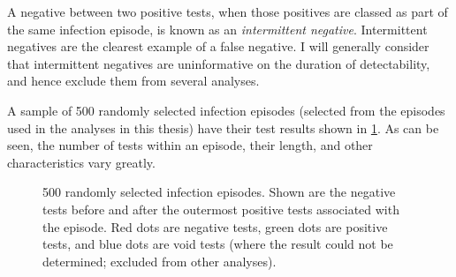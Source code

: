 \documentclass[12pt, letterpaper]{article} %
\begin{document}
A negative between two positive tests, when those positives are classed as part of the same infection episode, is known as an \emph{intermittent negative}.
Intermittent negatives are the clearest example of a false negative.
I will generally consider that intermittent negatives are uninformative on the duration of detectability, and hence exclude them from several analyses.

A sample of 500 randomly selected infection episodes (selected from the episodes used in the analyses in this thesis) have their test results shown in \cref{biology-data:fig:episodes}.
As can be seen, the number of tests within an episode, their length, and other characteristics vary greatly.
\begin{figure}
  \vspace{-5cm}
  \caption[CIS infection episodes]{%
    500 randomly selected infection episodes.
    Shown are the negative tests before and after the outermost positive tests associated with the episode.
    Red dots are negative tests, green dots are positive tests, and blue dots are void tests (where the result could not be determined; excluded from other analyses).
  }
  \label{biology-data:fig:episodes}
\end{figure}
\end{document}
